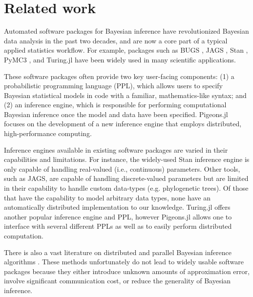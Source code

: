 \section{Related work}
Automated software packages for Bayesian inference have revolutionized Bayesian data 
analysis in the past two decades, and are now a core part of a typical applied statistics 
workflow. For example, packages such as BUGS 
\cite{lunn2013bugs, lunn2009bugs, lunn2000winbugs}, 
JAGS \cite{hornik2003jags}, Stan \cite{carpenter2017stan}, PyMC3 
\cite{salvatier2016probabilistic}, and Turing.jl \cite{ge2018turing} have been widely used in 
many scientific applications.

 
These software packages often provide two key user-facing components: (1) a 
probabilistic programming language (PPL), which allows users to specify Bayesian 
statistical models in code with a familiar, mathematics-like syntax; and (2) an 
inference engine, which is responsible for performing computational Bayesian
inference once the model and data have been specified. 
Pigeons.jl focuses on the development 
of a new inference engine that employs distributed, high-performance computing.


Inference engines available in existing software packages are varied in their 
capabilities and limitations. For instance, the widely-used Stan inference engine 
is only capable of handling real-valued (i.e., continuous) parameters. 
Other tools, such as JAGS, are capable of handling discrete-valued parameters but 
are limited in their capability to handle custom data-types 
(e.g. phylogenetic trees). 
Of those that have the capability to model arbitrary data types, 
none have an automatically distributed implementation to our knowledge.
Turing.jl \cite{ge2018turing} offers another popular inference engine and PPL, 
however Pigeons.jl allows one to interface with several different PPLs as well as 
to easily perform distributed computation.


There is also a vast literature on distributed and parallel 
Bayesian inference algorithms 
\cite{bardenet2017markov, brockwell2006parallel, calderhead2014general,
jacob2020unbiased, jacob2011using, lee2010utility, scott2016bayes, 
wang2015parallelizing, wu2017average, zhu2017big}.
These methods unfortunately do not lead to widely 
usable software packages because they either introduce unknown amounts of 
approximation error, involve significant communication cost, or reduce the 
generality of Bayesian inference. 
